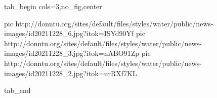  
 
 
 
 


\ifcmt
  tab_begin cols=3,no_fig,center

     pic http://donntu.org/sites/default/files/styles/water/public/news-images/id20211228_6.jpg?itok=ISYd90Yf
		 pic http://donntu.org/sites/default/files/styles/water/public/news-images/id20211228_3.jpg?itok=nABO91Zp
		 pic http://donntu.org/sites/default/files/styles/water/public/news-images/id20211228_2.jpg?itok=urRXf7KL

  tab_end
\fi
